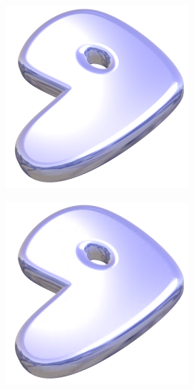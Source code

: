 \begin{figure}
  \centering
  \begin{subfigure}[b]{0.24\textwidth}
    \centering
    \includegraphics[width=\textwidth]{plaatjes/gentoo_db2_0_15.png}
  \end{subfigure}
  \begin{subfigure}[b]{0.24\textwidth}
    \centering
    \includegraphics[width=\textwidth]{plaatjes/gentoo_db2_0_1.png}

\end{subfigure}
\end{figure}
